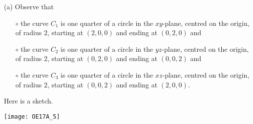 \begin{solution} 
(a) Observe that
\begin{itemize}\itemsep1pt \parskip0pt  %
\item[$\circ$]
the curve $C_1$ is one quarter of a circle in the $xy$-plane,
centred on the origin, of radius $2$, starting at $(2,0,0)$ and
ending at $(0,2,0)$ and
\item[$\circ$]
the curve $C_2$ is one quarter of a circle in the $yz$-plane,
centred on the origin, of radius $2$, starting at $(0,2,0)$ and
ending at $(0,0,2)$ and
\item[$\circ$]
the curve $C_3$ is one quarter of a circle in the $xz$-plane,
centred on the origin, of radius $2$, starting at $(0,0,2)$ and
ending at $(2,0,0)$.
\end{itemize}     
Here is a sketch.
\begin{center}
     \texttt{[image: OE17A\_5]}
\end{center}


\end{solution}
